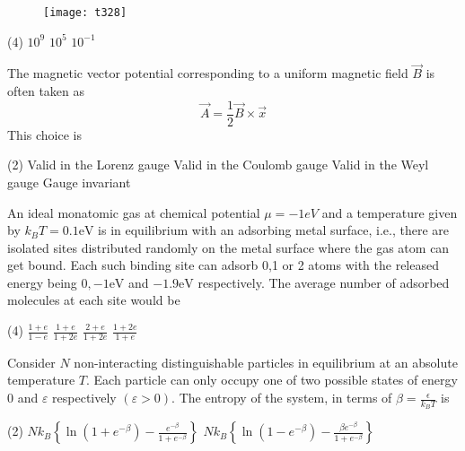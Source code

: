 \begin{questions}
\begin{minipage}{\textwidth}
\end{minipage}
\begin{figure}[H]
	\centering
	\texttt{[image: t328]}
\end{figure}
\begin{tasks}(4)
	\task[\textbf{A.}] $10^{9}$
	\task[\textbf{B.}] $10^{5}$
	\task[\textbf{D.}] $10^{-1}$
\end{tasks}
\begin{minipage}{\textwidth}
	\question The magnetic vector potential corresponding to a uniform magnetic field $\vec{B}$ is often taken as
	$$
	\vec{A}=\frac{1}{2} \vec{B} \times \vec{x}
	$$
	This choice is
\end{minipage}
\begin{tasks}(2)
	\task[\textbf{A.}] Valid in the Lorenz gauge
	\task[\textbf{B.}] Valid in the Coulomb gauge
	\task[\textbf{C.}] Valid in the Weyl gauge
	\task[\textbf{D.}] Gauge invariant
\end{tasks}
\begin{minipage}{\textwidth}
	\question An ideal monatomic gas at chemical potential $\mu=-1 e V$ and a temperature given by $k_{B} T=0.1 \mathrm{eV}$ is in equilibrium with an adsorbing metal surface, i.e., there are isolated sites distributed randomly on the metal surface where the gas atom can get bound. Each such binding site can adsorb 0,1 or 2 atoms with the released energy being $0,-1 \mathrm{eV}$ and $-1.9 \mathrm{eV}$ respectively. The average number of adsorbed molecules at each site would be
\end{minipage}
\begin{tasks}(4)
	\task[\textbf{A.}] $\frac{1+e}{1-e}$
	\task[\textbf{B.}] $\frac{1+e}{1+2 e}$
	\task[\textbf{C.}] $\frac{2+e}{1+2 e}$
	\task[\textbf{D.}] $\frac{1+2 e}{1+e}$
\end{tasks}
\begin{minipage}{\textwidth}
	\question Consider $N$ non-interacting distinguishable particles in equilibrium at an absolute temperature $T$. Each particle can only occupy one of two possible states of energy 0 and $\varepsilon$ respectively $(\varepsilon>0)$. The entropy of the system, in terms of $\beta=\frac{\epsilon}{k_{B} T}$ is
\end{minipage}
\begin{tasks}(2)
	\task[\textbf{A.}]   $N k_{B}\left\{\ln \left(1+e^{-\beta}\right)-\frac{e^{-\beta}}{1+e^{-\beta}}\right\}$
	\task[\textbf{B.}] $N k_{B}\left\{\ln \left(1-e^{-\beta}\right)-\frac{\beta e^{-\beta}}{1+e^{-\beta}}\right\}$

\end{tasks}
\end{questions}
